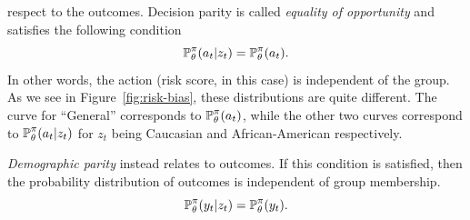 \begin{frame}
{    respect to the outcomes.  Decision parity is called \emph{equality
      of opportunity} and satisfies the following condition
    \begin{equation}
      \label{eq:equality-opportunity}
      \mathop{\mbox{\ensuremath{\mathbb{P}}}}\nolimits_\theta^\pi(a_t | z_t) =       \mathop{\mbox{\ensuremath{\mathbb{P}}}}\nolimits_\theta^\pi(a_t ).
    \end{equation}
    In other words, the action (risk score, in this case) is
    independent of the group.  As we see in
    Figure~\ref{fig:risk-bias}, these distributions are quite
    different.  The curve for ``General'' corresponds to
    $\mathop{\mbox{\ensuremath{\mathbb{P}}}}\nolimits_\theta^\pi(a_t )$, while the other two curves correspond to
    $\mathop{\mbox{\ensuremath{\mathbb{P}}}}\nolimits_\theta^\pi(a_t | z_t)$ for $z_t$ being Caucasian and
    African-American respectively.
    
    \emph{Demographic parity} instead relates to outcomes. If this
    condition is satisfied, then the probability distribution of
    outcomes is independent of group membership.
    \begin{equation}
      \label{eq:eqality-outcomes}
      \mathop{\mbox{\ensuremath{\mathbb{P}}}}\nolimits_\theta^\pi(y_t | z_t) =       \mathop{\mbox{\ensuremath{\mathbb{P}}}}\nolimits_\theta^\pi(y_t ).
    \end{equation}

  }
\end{frame}

